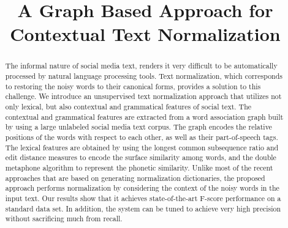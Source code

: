 \documentclass[preprint,review,12pt]{elsarticle}
\begin{document}
\begin{frontmatter}



\title{A Graph Based Approach for Contextual Text Normalization}


\author{}

\address{}

\begin{abstract}

The informal nature of social media text, renders it very difficult to be automatically processed by natural language processing tools. Text normalization, which corresponds to restoring the noisy words to their canonical forms, provides a solution to this challenge.
We introduce an unsupervised text normalization approach that utilizes not only lexical, but also contextual and grammatical features of social text.
The contextual and grammatical features are extracted from a word association graph built by using a large unlabeled social media text corpus.
The graph encodes the relative positions of the words with respect to each other, as well as their part-of-speech tags.
The lexical features are obtained by using the longest common subsequence ratio and edit distance measures to encode the surface similarity among words, and the double metaphone algorithm to represent the phonetic similarity. Unlike most of the recent approaches that are based on generating normalization dictionaries, the proposed approach performs normalization by considering the context of the noisy words in the input text.
Our results show that it achieves state-of-the-art F-score performance on a standard data set. In addition, the system can be tuned to achieve very high precision without sacrificing much from recall.


\end{abstract}
\end{frontmatter}
\end{document}
